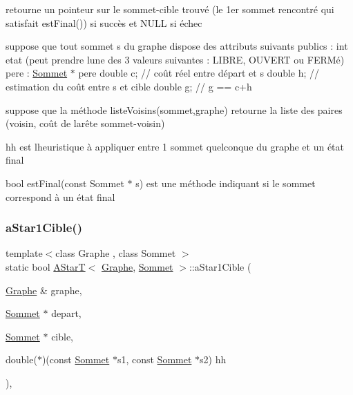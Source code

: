 retourne un pointeur sur le sommet-\/cible trouvé (le 1er sommet rencontré qui satisfait est\+Final()) si succès et N\+U\+LL si échec

suppose que tout sommet s du graphe dispose des attributs suivants publics \+: int etat (peut prendre l\textquotesingle{}une des 3 valeurs suivantes \+: L\+I\+B\+RE, O\+U\+V\+E\+RT ou F\+E\+R\+Mé) pere \+: \mbox{\hyperlink{class_sommet}{Sommet}} $\ast$ pere double c; // coût réel entre départ et s double h; // estimation du coût entre s et cible double g; // g == c+h

suppose que la méthode liste\+Voisins(sommet,graphe) retourne la liste des paires (voisin, coût de l\textquotesingle{}arête sommet-\/voisin)

hh est l\textquotesingle{}heuristique à appliquer entre 1 sommet quelconque du graphe et un état final

bool est\+Final(const Sommet $\ast$ s) est une méthode indiquant si le sommet correspond à un état final \mbox{\label{class_a_star_t_a32cec8b2f83ca9ce7329baaec2dd1a82}} 
\subsubsection{\texorpdfstring{aStar1Cible()}{aStar1Cible()}}
{\footnotesize\ttfamily template$<$class Graphe , class Sommet $>$ \\
static bool \mbox{\hyperlink{class_a_star_t}{A\+StarT}}$<$ \mbox{\hyperlink{class_graphe}{Graphe}}, \mbox{\hyperlink{class_sommet}{Sommet}} $>$\+::a\+Star1\+Cible (\begin{DoxyParamCaption}\item[{\mbox{\hyperlink{class_graphe}{Graphe}} \&}]{graphe,  }\item[{\mbox{\hyperlink{class_sommet}{Sommet}} $\ast$}]{depart,  }\item[{\mbox{\hyperlink{class_sommet}{Sommet}} $\ast$}]{cible,  }\item[{double($\ast$)(const \mbox{\hyperlink{class_sommet}{Sommet}} $\ast$s1, const \mbox{\hyperlink{class_sommet}{Sommet}} $\ast$s2)}]{hh }\end{DoxyParamCaption})\hspace{0.3cm}{\ttfamily [inline]}, {\ttfamily [static]}}



